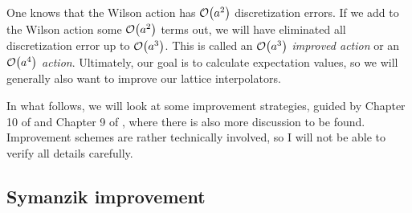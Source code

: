 One knows that the Wilson action has
$\order{a^2}$ discretization errors. If we add to the Wilson action some
$\order{a^2}$ terms out, we will have eliminated all discretization error
up to $\order{a^3}$. This is called an $\order{a^3}$ {\it improved action}
or an $\order{a^4}$ {\it action}. Ultimately, our goal is to calculate
expectation values, so we will generally also want to improve our 
lattice interpolators. 

In what follows, we will look at some improvement strategies, guided by 
Chapter 10 of \cite{degrand_lattice_2006} and Chapter 9 of
\cite{gattringer_quantum_2010}, where there is also more discussion to 
be found. Improvement schemes are rather technically
involved, so I will not be able to verify all details carefully.

\subsection{Symanzik improvement}\label{sec:symanzikImprovement}

